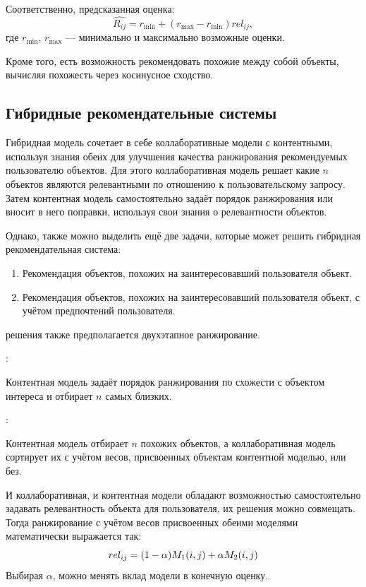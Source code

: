 Соответственно, предсказанная оценка:
\begin{equation}\label{eq:content-user-rating}
        \hat{R_{ij}} = r_{\min} + (r_{\max} - r_{\min}) rel_{ij},
\end{equation}
где $r_{\min}$, $r_{\max}$ --- минимально и максимально возможные оценки.

Кроме того, есть возможность рекомендовать похожие между собой объекты, вычисляя похожесть через косинусное сходство.
\pagebreak

\subsection{Гибридные рекомендательные системы}\label{subsec:hybrid_rec_systems}
Гибридная модель сочетает в себе коллаборативные модели с контентными, используя знания обеих для улучшения качества ранжирования рекомендуемых пользователю объектов.
Для этого коллаборативная модель решает какие $n$ объектов являются релевантными по отношению к пользовательскому запросу.
Затем контентная модель самостоятельно задаёт порядок ранжирования или вносит в него поправки, используя свои знания о релевантности объектов.

Однако, также можно выделить ещё две задачи, которые может решить гибридная рекомендательная система:
\begin{enumerate}
    \item Рекомендация объектов, похожих на заинтересовавший пользователя объект.
    \item Рекомендация объектов, похожих на заинтересовавший пользователя объект, с учётом предпочтений пользователя.
\end{enumerate}

 решения также предполагается двухэтапное ранжирование.

:
\begin{addmargin}[2em]{1em}%
Контентная модель задаёт порядок ранжирования по схожести с объектом интереса и отбирает $n$ самых близких.
\end{addmargin}

:
\begin{addmargin}[2em]{1em}%
Контентная модель отбирает $n$ похожих объектов, а коллаборативная модель сортирует их с учётом весов, присвоенных объектам контентной моделью, или без.
\end{addmargin}

\vspace{1em}
И коллаборативная, и контентная модели обладают возможностью самостоятельно задавать релевантность объекта для пользователя, их решения можно совмещать.
Тогда ранжирование с учётом весов присвоенных обеими моделями математически выражается так:
\begin{equation}\label{eq:hybrid}
rel_{ij} = (1 - \alpha)\space M_1(i, j) + \alpha\space M_2(i, j)
\end{equation}
Выбирая $\alpha$, можно менять вклад модели в конечную оценку.
